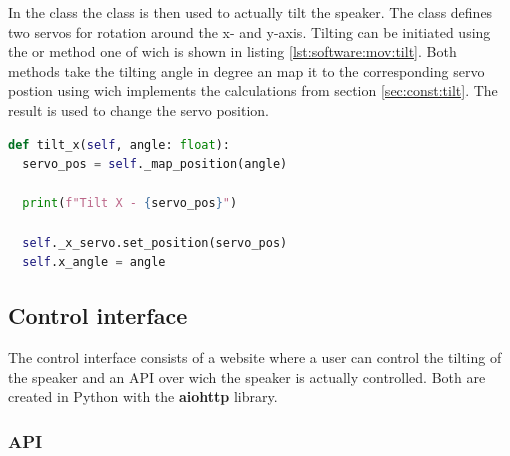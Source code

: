 %
In the class  the  class is then used to actually tilt the speaker. The class defines two servos for rotation around the x- and y-axis. Tilting can be initiated using the  or  method one of wich is shown in listing \ref{lst:software:mov:tilt}. Both methods take the tilting angle in degree an map it to the corresponding servo postion using  wich implements the calculations from section \ref{sec:const:tilt}. The result is used to change the servo position.
%
\begin{mdframed}
\begin{lstlisting}[language=python, caption=Method for titling the speaker around the x-axis, label=lst:software:mov:tilt]
def tilt_x(self, angle: float):
  servo_pos = self._map_position(angle)

  print(f"Tilt X - {servo_pos}")

  self._x_servo.set_position(servo_pos)
  self.x_angle = angle
\end{lstlisting}
\end{mdframed}

\subsection{Control interface}
%
The control interface consists of a website where a user can control the tilting of the speaker and an API over wich the speaker is actually controlled. Both are created in Python with the \textbf{aiohttp} library.

\subsubsection*{API}

